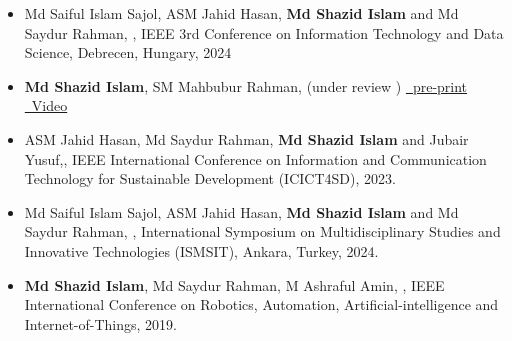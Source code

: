 \documentclass[a4paper,7 pt]{article}
\begin{document}
\begin{itemize}
\item Md Saiful Islam Sajol, ASM Jahid Hasan, \textbf{Md Shazid Islam} and Md Saydur Rahman, , IEEE 3rd Conference on Information Technology and Data Science, Debrecen, Hungary, 2024
 




\item \textbf{Md Shazid Islam}, SM Mahbubur Rahman,  (under review )
\href{https://papers.ssrn.com/sol3/papers.cfm?abstract_id=4735109}
{\raisebox{-0.05\height}\ pre-print} \href{https://youtu.be/ATaC7Cj0UIA}{\raisebox{-0.05\height}\ Video}




\item ASM Jahid Hasan, Md Saydur Rahman, \textbf{Md Shazid Islam} and Jubair Yusuf,, IEEE International Conference on Information and Communication Technology for Sustainable Development (ICICT4SD), 2023.



\item Md Saiful Islam Sajol, ASM Jahid Hasan, \textbf{Md Shazid Islam} and Md Saydur Rahman, , International Symposium on Multidisciplinary Studies and Innovative Technologies (ISMSIT), Ankara, Turkey, 2024.

\item \textbf{Md Shazid Islam}, Md Saydur Rahman, M Ashraful Amin, , IEEE International Conference on Robotics, Automation, Artificial-intelligence and Internet-of-Things, 2019.
    
\end{itemize}
\end{document}
